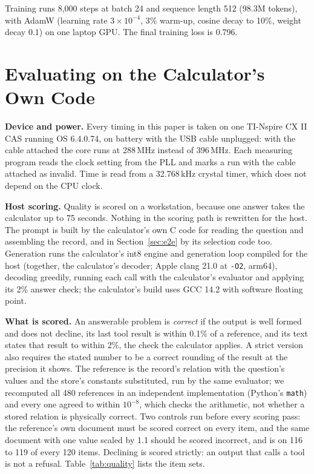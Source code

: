 \documentclass[10pt]{article}
\begin{document}
Training runs 8,000 steps at batch 24 and sequence length 512 (98.3M tokens), with AdamW
(learning rate $3\times10^{-4}$, 3\% warm-up, cosine decay to 10\%, weight decay 0.1) on one laptop
GPU. The final training loss is 0.796.

\section{Evaluating on the Calculator's Own Code}
\label{sec:eval}

\textbf{Device and power.} Every timing in this paper is taken on one TI-Nspire CX II CAS running
OS 6.4.0.74, on battery with the USB cable unplugged: with the cable attached the core runs at
288\,MHz instead of 396\,MHz. Each measuring program reads the clock setting from the PLL and marks a
run with the cable attached as invalid. Time is read from a 32.768\,kHz crystal timer, which does not
depend on the CPU clock.

\textbf{Host scoring.} Quality is scored on a workstation, because one answer takes the calculator up
to 75 seconds. Nothing in the scoring path is rewritten for the host. The prompt is built by the
calculator's own C code for reading the question and assembling the record, and in Section~\ref{sec:e2e}
by its selection code too. Generation runs the calculator's int8 engine and generation loop compiled for
the host (together, the calculator's decoder; Apple clang 21.0 at \texttt{-O2}, arm64), decoding greedily,
running each call with the calculator's evaluator and applying its 2\% answer check; the calculator's
build uses GCC 14.2 with software floating point.

\textbf{What is scored.} An answerable problem is \emph{correct} if the output is well formed and does not
decline, its last tool result is within 0.1\% of a reference, and its text states that result to within
2\%, the check the calculator applies. A strict version also requires the stated number to be a correct
rounding of the result at the precision it shows. The reference is the record's relation with the
question's values and the store's constants substituted, run by the same evaluator; we recomputed all
480 references in an independent implementation (Python's \texttt{math}) and every one agreed to within
$10^{-8}$, which checks the arithmetic, not whether a stored relation is physically correct. Two controls
run before every scoring pass: the reference's own document must be scored correct on every item, and the
same document with one value scaled by 1.1 should be scored incorrect, and is on 116 to 119 of every 120
items. Declining is scored strictly: an output that calls a tool is not a refusal. Table~\ref{tab:quality}
lists the item sets.
\end{document}
